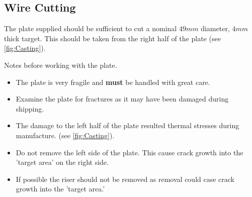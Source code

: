 \subsection{Wire Cutting}
The plate supplied should be sufficient to cut a nominal $49mm$ diameter, $4mm$ thick target. This should be taken from the right half of the plate (see \ref{fig:Casting}). 

Notes before working with the plate.
\begin{itemize}
\item The plate is very fragile and \textbf{must} be handled with great care. 
\item Examine the plate for fractures as it may have been damaged during shipping. 
\item The damage to the left half of the plate resulted thermal stresses during manufacture. (see \ref{fig:Casting}). 
\item Do not remove the left side of the plate. This cause crack growth into the 'target area' on the right side.
\item If possible the riser should not be removed as removal could case crack growth into the 'target area.'
\end{itemize}